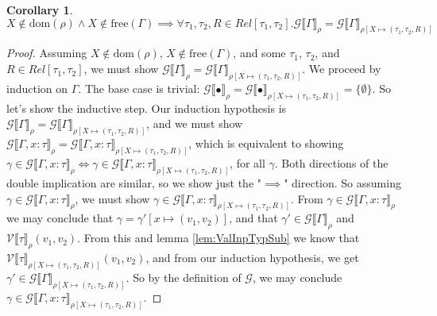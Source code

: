 \documentclass[twoside,11pt,openright]{report}
\newtheorem{corollary}{Corollary}[theorem]
\theoremstyle{definition}
\newcommand{\var}{x}
\newcommand{\val}{v}
\newcommand{\Tvar}{X}
\newcommand{\typ}{\tau}
\newcommand{\venv}{\Gamma}
\newcommand{\empvenv}{\bullet}
\newcommand{\ValInp}[2]{\mathcal{V} \llbracket #1 \rrbracket_{#2}}
\newcommand{\VenvInp}[2]{\mathcal{G} \llbracket #1 \rrbracket_{#2}}
\newcommand{\map}[2]{#1 \mapsto #2}
\begin{document}
\begin{corollary}\label{cor:VenvInp}
  $\Tvar \notin \mathrm{dom}(\rho) \land \Tvar \notin \mathrm{free}(\venv) \implies \forall \typ_1, \typ_2, R \in Rel[\typ_1, \typ_2] . \VenvInp{\venv}{\rho} = \VenvInp{\venv}{\rho[\map{\Tvar}{(\typ_1, \typ_2, R)}]}$
\end{corollary}
\begin{proof}
  Assuming $\Tvar \notin \mathrm{dom}(\rho)$, $\Tvar \notin \mathrm{free}(\venv)$, and some $\typ_1$, $\typ_2$, and $R \in Rel[\typ_1, \typ_2]$, we must show $\VenvInp{\venv}{\rho} = \VenvInp{\venv}{\rho[\map{\Tvar}{(\typ_1, \typ_2, R)}]}$. We proceed by induction on $\venv$. The base case is trivial: $\VenvInp{\empvenv}{\rho} = \VenvInp{\empvenv}{\rho[\map{\Tvar}{(\typ_1, \typ_2, R)}]} = \{\emptyset\}$. So let's show the inductive step. Our induction hypothesis is $\VenvInp{\venv}{\rho} = \VenvInp{\venv}{\rho[\map{\Tvar}{(\typ_1, \typ_2, R)}]}$, and we must show $\VenvInp{\venv, \var : \typ}{\rho} = \VenvInp{\venv, \var : \typ}{\rho[\map{\Tvar}{(\typ_1, \typ_2, R)}]}$, which is equivalent to showing $\gamma \in \VenvInp{\venv, \var : \typ}{\rho} \iff \gamma \in \VenvInp{\venv, \var : \typ}{\rho[\map{\Tvar}{(\typ_1, \typ_2, R)}]}$, for all $\gamma$. Both directions of the double implication are similar, so we show just the "$\implies$" direction. So assuming $\gamma \in \VenvInp{\venv, \var : \typ}{\rho}$, we must show $\gamma \in \VenvInp{\venv, \var : \typ}{\rho[\map{\Tvar}{(\typ_1, \typ_2, R)}]}$. From $\gamma \in \VenvInp{\venv, \var : \typ}{\rho}$ we may conclude that $\gamma = \gamma'[\map{\var}{(\val_1, \val_2)}]$, and that $\gamma' \in \VenvInp{\venv}{\rho}$ and $\ValInp{\typ}{\rho}(\val_1, \val_2)$. From this and lemma \ref{lem:ValInpTypSub} we know that $\ValInp{\typ}{\rho[\map{\Tvar}{(\typ_1, \typ_2, R)}]}(\val_1, \val_2)$, and from our induction hypothesis, we get $\gamma' \in \VenvInp{\venv}{\rho[\map{\Tvar}{(\typ_1, \typ_2, R)}]}$. So by the definition of $\mathcal{G}$, we may conclude $\gamma \in \VenvInp{\venv, \var : \typ}{\rho[\map{\Tvar}{(\typ_1, \typ_2, R)}]}$.
\end{proof}
\end{document}
